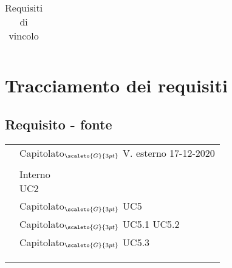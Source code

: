 {{{{\begin{center}
\begin{longtable}{|p{3cm}|p{4cm}|p{4cm}|p{4cm}|}
		\caption[Requisiti di vincolo]{Requisiti di vincolo}\label{4.4}\\
	\end{longtable}
\end{center}

\section{Tracciamento dei requisiti}\label{RequisitiTracciamentoDeiRequisiti}

\subsection{Requisito - fonte}\label{RequisitiTracciamentoDeiRequisitiFonte}

\def\tabularxcolumn#1{m{#1}}
{
	\begin{center}
		\renewcommand{\arraystretch}{1.4}
		\begin{longtable}{|p{7.5cm}|p{7.5cm}|}
		\hline
		\rowcolor{airforceblue}
		\makecell[tc]{\textbf{Codice RS}} & \makecell[c]{\textbf{Fonte}}  \\
		\hline
		\makecell[tc]{RSFO1} & \makecell[tc]{Capitolato$_{\scaleto{G}{3pt}}$\\V. esterno 17-12-2020} \\
		\hline
		\makecell[tc]{RSFF2} & \makecell[tc]{Capitolato$_{\scaleto{G}{3pt}}$}\\
		\hline
		\makecell[tc]{RSFO3} & \makecell[tc]{Interno \\ UC2}\\
		\hline
		\makecell[tc]{RSFO4} & \makecell[tc]{Capitolato$_{\scaleto{G}{3pt}}$\\UC5}\\
		\hline
		\makecell[tc]{RSFO4.1} & \makecell[tc]{Capitolato$_{\scaleto{G}{3pt}}$\\UC5.1 \\ UC5.2}\\
		\hline
		\makecell[tc]{RSFO4.2} & \makecell[tc]{Capitolato$_{\scaleto{G}{3pt}}$\\UC5.3}\\
		\hline
		\makecell[tc]{RSFO5} & \makecell[tc]{Capitolato$_{\scaleto{G}{3pt}}$}\\
		\hline
		\makecell[tc]{RSFD5.1} & \makecell[tc]{Capitolato$_{\scaleto{G}{3pt}}$}\\
		\hline
		\makecell[tc]{RSFD6}& \makecell[tc]{Capitolato$_{\scaleto{G}{3pt}}$}\\

\end{longtable}
\end{center}}}}}}
